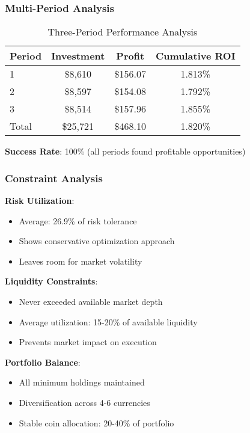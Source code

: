 \documentclass{beamer}
\begin{document}
\begin{frame}
\frametitle{Multi-Period Analysis}
\begin{table}[h]
\centering
\begin{tabular}{@{}lccc@{}}
\toprule
Period & Investment & Profit & Cumulative ROI \\
\midrule
1 & \$8,610 & \$156.07 & 1.813\% \\
2 & \$8,597 & \$154.08 & 1.792\% \\
3 & \$8,514 & \$157.96 & 1.855\% \\
\midrule
Total & \$25,721 & \$468.10 & 1.820\% \\
\bottomrule
\end{tabular}
\caption{Three-Period Performance Analysis}
\end{table}

\vspace{0.5cm}

\textbf{Success Rate}: 100\% (all periods found profitable opportunities)
\end{frame}

\begin{frame}
\frametitle{Constraint Analysis}
\textbf{Risk Utilization}:
\begin{itemize}
    \item Average: 26.9\% of risk tolerance
    \item Shows conservative optimization approach
    \item Leaves room for market volatility
\end{itemize}

\vspace{0.5cm}

\textbf{Liquidity Constraints}:
\begin{itemize}
    \item Never exceeded available market depth
    \item Average utilization: 15-20\% of available liquidity
    \item Prevents market impact on execution
\end{itemize}

\vspace{0.5cm}

\textbf{Portfolio Balance}:
\begin{itemize}
    \item All minimum holdings maintained
    \item Diversification across 4-6 currencies
    \item Stable coin allocation: 20-40\% of portfolio
\end{itemize}
\end{frame}
\end{document}
